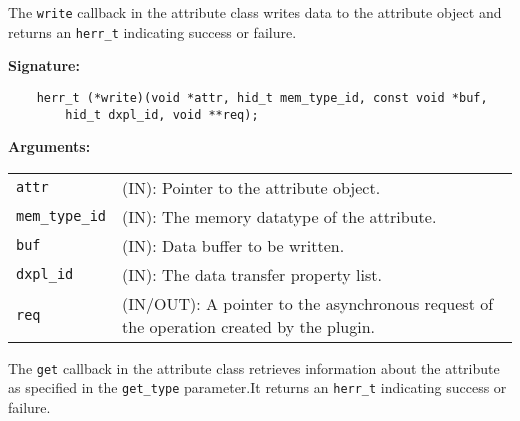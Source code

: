 The \texttt{write} callback in the attribute class writes data to
the attribute object and returns an \texttt{herr\_t} indicating success or
failure.\bigskip

\begin{mdframed}[style=bgbox]
\textbf{Signature:}
\begin{lstlisting}
    herr_t (*write)(void *attr, hid_t mem_type_id, const void *buf, 
        hid_t dxpl_id, void **req);
\end{lstlisting}

\textbf{Arguments:}\\
\begin{tabular}{l p{10cm}}
  \texttt{attr} & (IN): Pointer to the attribute object.\\
  \texttt{mem\_type\_id} & (IN): The memory datatype of the attribute.\\
  \texttt{buf} & (IN): Data buffer to be written.\\
  \texttt{dxpl\_id} & (IN): The data transfer property list.\\
  \texttt{req} & (IN/OUT): A pointer to the asynchronous request of the
  operation created by the plugin.\\
\end{tabular}
\end{mdframed}

The \texttt{get} callback in the attribute class retrieves
information about the attribute as specified in the \texttt{get\_type}
parameter.It returns an \texttt{herr\_t} indicating success or failure.\bigskip

